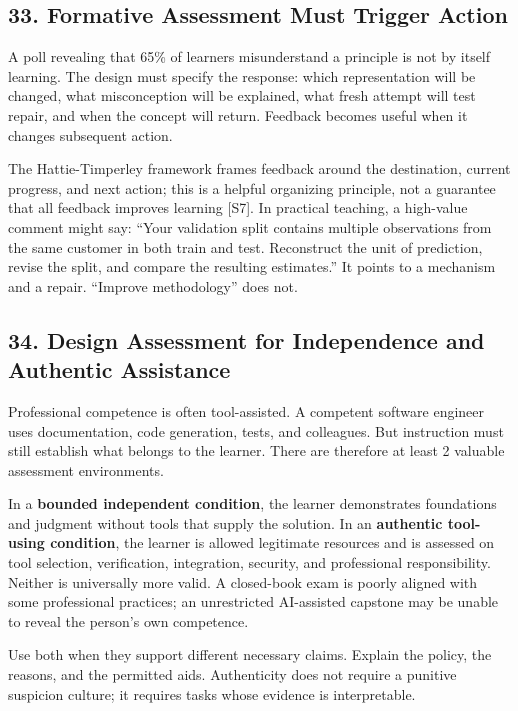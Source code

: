 \subsection*{33. Formative Assessment Must Trigger Action}

A poll revealing that 65\% of learners misunderstand a principle is not by itself learning. The design must specify the response: which representation will be changed, what misconception will be explained, what fresh attempt will test repair, and when the concept will return. Feedback becomes useful when it changes subsequent action.

The Hattie-Timperley framework frames feedback around the destination, current progress, and next action; this is a helpful organizing principle, not a guarantee that all feedback improves learning [S7]. In practical teaching, a high-value comment might say: ``Your validation split contains multiple observations from the same customer in both train and test. Reconstruct the unit of prediction, revise the split, and compare the resulting estimates.'' It points to a mechanism and a repair. ``Improve methodology'' does not.

\subsection*{34. Design Assessment for Independence and Authentic Assistance}

Professional competence is often tool-assisted. A competent software engineer uses documentation, code generation, tests, and colleagues. But instruction must still establish what belongs to the learner. There are therefore at least 2 valuable assessment environments.

In a \textbf{bounded independent condition}, the learner demonstrates foundations and judgment without tools that supply the solution. In an \textbf{authentic tool-using condition}, the learner is allowed legitimate resources and is assessed on tool selection, verification, integration, security, and professional responsibility. Neither is universally more valid. A closed-book exam is poorly aligned with some professional practices; an unrestricted AI-assisted capstone may be unable to reveal the person's own competence.

Use both when they support different necessary claims. Explain the policy, the reasons, and the permitted aids. Authenticity does not require a punitive suspicion culture; it requires tasks whose evidence is interpretable.

